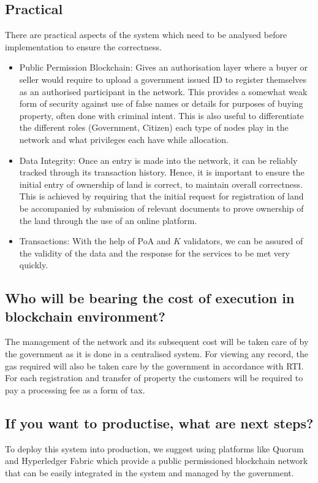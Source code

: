 \documentclass[conference]{IEEEtran}
\begin{document}
\subsection{Practical}
There are practical aspects of the system which need to be analysed before implementation to ensure the correctness.

\begin{itemize}
    \item Public Permission Blockchain: Gives an authorisation layer where a buyer or seller would require to upload a government issued ID to register themselves as an authorised participant in the network. This provides a somewhat weak form of security against use of false names or details for purposes of buying property, often done with criminal intent. This is also useful to differentiate the different roles (Government, Citizen) each type of nodes play in the network and what privileges each have while allocation.
    \item Data Integrity: Once an entry is made into the network, it can be reliably tracked through its transaction history. Hence, it is important to ensure the initial entry of ownership of land is correct, to maintain overall correctness. This is achieved by requiring that the initial request for registration of land be accompanied by submission of relevant documents to prove ownership of the land through the use of an online platform.
    \item Transactions: With the help of PoA and $K$ validators, we can be assured of the validity of the data and the response for the services to be met very quickly.
\end{itemize}

\subsection{Who will be bearing the cost of execution in blockchain environment?}
The management of the network and its subsequent cost will be taken care of by the government as it is done in a centralised system. For viewing any record, the gas required will also be taken care by the government in accordance with RTI. For each registration and transfer of property the customers will be required to pay a processing fee as a form of tax.

\subsection{If you want to productise, what are next steps?}
To deploy this system into production, we suggest using platforms like Quorum and Hyperledger Fabric which provide a public permissioned blockchain network that can be easily integrated in the system and managed by the government. 
\end{document}
